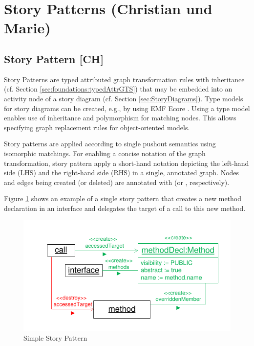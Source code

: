 \section{Story Patterns (Christian und Marie)} \label{sec:StoryPatterns}



\subsection{Story Pattern [CH]}
\label{sec:StoryPatterns:storyPattern}

Story Patterns are typed attributed graph transformation rules with inheritance (cf. Section \ref{sec:foundations:typedAttrGTS}) that may be embedded into an activity node of a story diagram (cf. Section \ref{sec:StoryDiagrams}). Type models for story diagrams can be created, e.g., by using EMF Ecore \cite{SBP+08}.  Using a type model enables use of inheritance and polymorphism for matching nodes.
This allows specifying graph replacement rules for object-oriented models.


Story patterns are applied according to single pushout semantics using isomorphic matchings.
For enabling a concise notation of the graph transformation, story pattern apply a short-hand notation depicting the left-hand side (LHS) and the right-hand side (RHS) in a single, annotated graph. Nodes and edges being created (or deleted) are annotated with \create (or  \destroy, respectively).

Figure \ref{fig:simpleStoryPattern} shows an example of a single story pattern that creates a new method declaration in an interface and delegates the target of a call to this new method.

\begin{figure}[htbp]
  \centering
  \includegraphics[scale=1.0]{figures/SimpleStoryPattern}
  \caption{Simple Story Pattern}
  \label{fig:simpleStoryPattern}
\end{figure}

